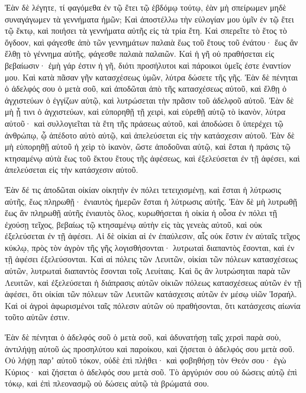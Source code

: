 {Ἐὰν δὲ λέγητε, τί φαγόμεθα ἐν τῷ ἔτει τῷ ἑβδόμῳ τούτῳ, ἐὰν μὴ σπείρωμεν μηδὲ συναγάγωμεν τὰ γεννήματα ἡμῶν;
Καὶ ἀποστέλλω τὴν εὐλογίαν μου ὑμῖν ἐν τῷ ἔτει τῷ ἕκτῳ, καὶ ποιήσει τὰ γεννήματα αὐτῆς εἰς τὰ τρία ἔτη.
Καὶ σπερεῖτε τὸ ἔτος τὸ ὄγδοον, καὶ φάγεσθε ἀπὸ τῶν γεννημάτων παλαιὰ ἕως τοῦ ἔτους τοῦ ἐνάτου· ἕως ἂν ἔλθῃ τὸ γέννημα αὐτῆς, φάγεσθε παλαιὰ παλαιῶν.
Καὶ ἡ γῆ οὐ πραθήσεται εἰς βεβαίωσιν· ἐμὴ γάρ ἐστιν ἡ γῆ, διότι προσήλυτοι καὶ πάροικοι ὑμεῖς ἐστε ἐναντίον μου.
Καὶ κατὰ πᾶσαν γῆν κατασχέσεως ὑμῶν, λύτρα δώσετε τῆς γῆς.
Ἐὰν δὲ πένηται ὁ ἀδελφός σου ὁ μετὰ σοῦ, καὶ ἀποδῶται ἀπὸ τῆς κατασχέσεως αὐτοῦ, καὶ ἔλθῃ ὁ ἀγχιστεύων ὁ ἐγγίζων αὐτῷ, καὶ λυτρώσεται τὴν πρᾶσιν τοῦ ἀδελφοῦ αὐτοῦ.
Ἐὰν δὲ μὴ ᾖ τινι ὁ ἀγχιστεύων, καὶ εὐπορηθῇ τῇ χειρὶ, καὶ εὑρεθῇ αὐτῷ τὸ ἱκανὸν, λύτρα αὐτοῦ·
καὶ συλλογιεῖται τὰ ἔτη τῆς πράσεως αὐτοῦ, καὶ ἀποδώσει ὅ ὑπερέχει τῷ ἀνθρώπῳ, ᾧ ἀπέδοτο αὐτὸ αὐτῷ, καὶ ἀπελεύσεται εἰς τὴν κατάσχεσιν αὐτοῦ.
Ἐὰν δὲ μὴ εὑπορηθῇ αὐτοῦ ἡ χεὶρ τὸ ἱκανὸν, ὥστε ἀποδοῦναι αὐτῷ, καὶ ἔσται ἡ πράσις τῷ κτησαμένῳ αὐτὰ ἕως τοῦ ἕκτου ἔτους τῆς ἀφέσεως, καὶ ἐξελεύσεται ἐν τῇ ἀφέσει, καὶ ἀπελεύσεται εἰς τὴν κατάσχεσιν αὐτοῦ.
\par }{\PP {}Ἐὰν δέ τις ἀποδῶται οἰκίαν οἰκητὴν ἐν πόλει τετειχισμένῃ, καὶ ἔσται ἡ λύτρωσις αὐτῆς, ἕως πληρωθῇ· ἐνιαυτὸς ἡμερῶν ἔσται ἡ λύτρωσις αὐτῆς.
Ἐὰν δὲ μὴ λυτρωθῇ ἕως ἂν πληρωθῇ αὐτῆς ἐνιαυτὸς ὅλος, κυρωθήσεται ἡ οἰκία ἡ οὖσα ἐν πόλει τῇ ἐχούσῃ τεῖχος, βεβαίως τῷ κτησαμένῳ αὐτὴν εἰς τὰς γενεὰς αὐτοῦ, καὶ οὐκ ἐξελεύσεται ἐν τῇ ἀφέσει.
Αἱ δὲ οἰκίαι αἱ ἐν ἐπαύλεσιν, αἷς οὐκ ἔστιν ἐν αὐταῖς τεῖχος κύκλῳ, πρὸς τὸν ἀγρὸν τῆς γῆς λογισθήσονται· λυτρωταὶ διαπαντὸς ἔσονται, καὶ ἐν τῇ ἀφέσει ἐξελεύσονται.
Καὶ αἱ πόλεις τῶν Λευιτῶν, οἰκίαι τῶν πόλεων κατασχέσεως αὐτῶν, λυτρωταὶ διαπαντὸς ἔσονται τοῖς Λευίταις.
Καὶ ὃς ἂν λυτρώσηται παρὰ τῶν Λευιτῶν, καὶ ἐξελεύσεται ἡ διάπρασις αὐτῶν οἰκιῶν πόλεως κατασχέσεως αὐτῶν ἐν τῇ ἀφέσει, ὅτι οἰκίαι τῶν πόλεων τῶν Λευιτῶν κατάσχεσις αὐτῶν ἐν μέσῳ υἱῶν Ἰσραήλ.
Καὶ οἱ ἀγροὶ ἀφωρισμένοι ταῖς πόλεσιν αὐτῶν οὐ πραθήσονται, ὅτι κατάσχεσις αἰωνία τοῦτο αὐτῶν ἐστιν.
\par }{\PP {}Ἐὰν δὲ πένηται ὁ ἀδελφός σοῦ ὁ μετὰ σοῦ, καὶ ἀδυνατήσῃ ταῖς χερσὶ παρὰ σοὺ, ἀντιλήψῃ αὐτοῦ ὡς προσηλύτου καὶ παροίκου, καὶ ζήσεται ὁ ἀδελφός σου μετὰ σοῦ.
Οὐ λήψῃ παρʼ αὐτοῦ τόκον, οὐδὲ ἐπὶ πλήθει· καὶ φοβηθήσῃ τὸν Θεόν σου· ἐγὼ Κύριος· καὶ ζήσεται ὁ ἀδελφός σου μετὰ σοῦ.
Τὸ ἀργύριόν σου οὐ δώσεις αὐτῷ ἐπὶ τόκῳ, καὶ ἐπὶ πλεονασμῷ οὐ δώσεις αὐτῷ τὰ βρώματά σου.
}
